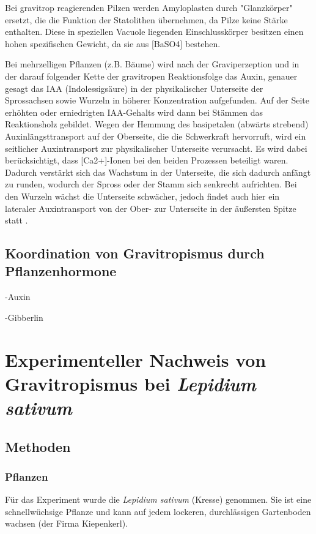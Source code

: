 \documentclass[
a4paper, 
11pt, 
ngerman,
listof=totoc,
bibliography=totocnumbered,
abstracton
]{scrreprt}
\begin{document}
Bei gravitrop reagierenden Pilzen werden Amyloplasten durch "Glanzkörper" ersetzt, die die Funktion der Statolithen übernehmen, da Pilze keine Stärke enthalten. Diese in speziellen Vacuole liegenden Einschlusskörper besitzen einen hohen spezifischen Gewicht, da sie aus [BaSO4] bestehen.

Bei mehrzelligen Pflanzen (z.B. Bäume) wird  nach der Graviperzeption und in der darauf folgender Kette der gravitropen Reaktionsfolge  das Auxin, genauer gesagt das IAA (Indolessigsäure) in der physikalischer Unterseite der Sprossachsen sowie Wurzeln in höherer Konzentration aufgefunden.
Auf der Seite erhöhten oder erniedrigten IAA-Gehalts wird dann bei Stämmen das Reaktionsholz gebildet. Wegen der Hemmung des basipetalen (abwärts strebend) Auxinlängsttransport auf der Oberseite, die die Schwerkraft hervorruft, wird ein seitlicher Auxintransport zur physikalischer Unterseite verursacht. Es wird dabei berücksichtigt, dass [Ca2+]-Ionen bei den beiden Prozessen beteiligt waren.
Dadurch verstärkt sich das Wachstum in der Unterseite, die sich dadurch anfängt zu runden, wodurch der Spross oder der Stamm sich senkrecht aufrichten. 
Bei den Wurzeln wächst die Unterseite schwächer, jedoch findet auch hier ein lateraler Auxintransport von der Ober- zur Unterseite in der äußersten Spitze statt \parencite[453f]{Strasburger}.
    
\section{Koordination von Gravitropismus durch Pflanzenhormone}

-Auxin

-Gibberlin 

\chapter{Experimenteller Nachweis von Gravitropismus bei \emph{Lepidium sativum}}

\section{Methoden}

\subsection{Pflanzen}

Für das Experiment wurde die \emph{Lepidium sativum} (Kresse) genommen. Sie ist eine schnellwüchsige Pflanze und kann auf jedem lockeren, durchlässigen Gartenboden wachsen (der Firma Kiepenkerl).
\end{document}

